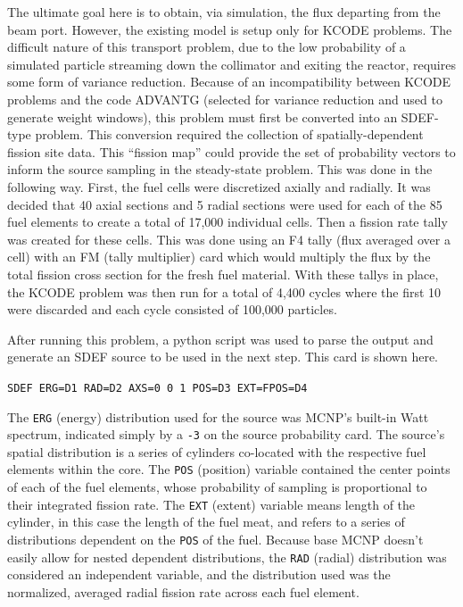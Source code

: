 The ultimate goal here is to obtain, via simulation, the flux departing from the beam port.
However, the existing model is setup only for KCODE problems.
The difficult nature of this transport problem, due to the low probability of a simulated particle streaming down the collimator and exiting the reactor, requires some form of variance reduction.
Because of an incompatibility between KCODE problems and the code ADVANTG (selected for variance reduction and used to generate weight windows), this problem must first be converted into an SDEF-type problem.
This conversion required the collection of spatially-dependent fission site data.
This ``fission map'' could provide the set of probability vectors to inform the source sampling in the steady-state problem.
This was done in the following way.
First, the fuel cells were discretized axially and radially.
It was decided that 40 axial sections and 5 radial sections were used for each of the 85 fuel elements to create a total of 17,000 individual cells.
Then a fission rate tally was created for these cells.
This was done using an F4 tally (flux averaged over a cell) with an FM (tally multiplier) card which would multiply the flux by the total fission cross section for the fresh fuel material.
With these tallys in place, the KCODE problem was then run for a total of 4,400 cycles where the first 10 were discarded and each cycle consisted of 100,000 particles.

After running this problem, a python script was used to parse the output and generate an SDEF source to be used in the next step.
This card is shown here.

\begin{center}
{\tt SDEF ERG=D1 RAD=D2  AXS=0 0 1  POS=D3  EXT=FPOS=D4}
\end{center}

The {\tt ERG} (energy) distribution used for the source was MCNP's built-in Watt spectrum, indicated simply by a {\tt -3} on the source probability card.
The source's spatial distribution is a series of cylinders co-located with the respective fuel elements within the core.
The {\tt POS} (position) variable contained the center points of each of the fuel elements, whose probability of sampling is proportional to their integrated fission rate.
The {\tt EXT} (extent) variable means length of the cylinder, in this case the length of the fuel meat, and refers to a series of distributions dependent on the {\tt POS} of the fuel.
Because base MCNP doesn't easily allow for nested dependent distributions, the {\tt RAD} (radial) distribution was considered an independent variable, and the distribution used was the normalized, averaged radial fission rate across each fuel element.

